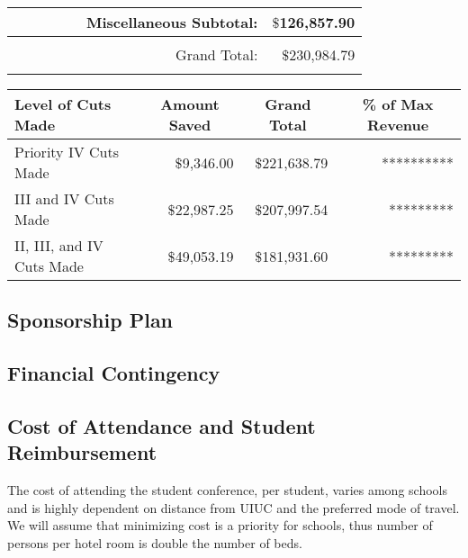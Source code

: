 \begin{tabular}{clcrccccr}
     &                           &                           &                           &                           &\multicolumn{3}{r}{Miscellaneous Subtotal:}                                       & $\$$126,857.90           \\ \hline\hline
     &                           &                           &                           &                           &                          &                           &                           &                          \\
     &                           &                           &                           &                           &\multicolumn{3}{r}{Grand Total:}                                                  & $\$$230,984.79           \\
     &                           &                           &                           &                           &                          &                           &                           &                          \\ \hline\hline
  \end{tabular}
    \begin{tabular}{lrrr}
  \hline\hline
  \multicolumn{1}{l}{Level of Cuts Made} & \multicolumn{1}{c}{Amount Saved} & \multicolumn{1}{c}{Grand Total} & \multicolumn{1}{c}{\% of Max Revenue} \\ \hline\hline 
  Priority IV Cuts Made & $\$$9,346.00 & $\$$221,638.79 & ********** \\
  III and IV Cuts Made & $\$$22,987.25 &$\$$207,997.54 & ********* \\
  II, III, and IV Cuts Made & $\$$49,053.19 & $\$$181,931.60 & ********* \\
  
  \end{tabular}
\subsection{Sponsorship Plan}



\subsection{Financial Contingency}

\subsection{Cost of Attendance and Student Reimbursement}
The cost of attending the student conference, per student, varies among schools and is highly dependent on distance from UIUC and the preferred mode of travel. We will assume that minimizing cost is a priority for schools, thus number of persons per hotel room is double the number of beds. 

